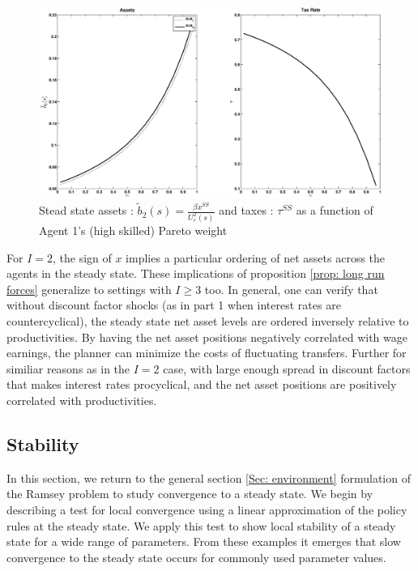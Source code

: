 \documentclass[thmsb,11pt]{article}
\begin{document}
  \begin{figure}[htp]
 \centering
 \includegraphics[width=\textwidth]{Draft25Graphs/SS_alpha1.eps}
 \caption{ Stead state assets : $\tilde{b}_2(s)=\frac{\beta  x^{SS}}{U^2_c(s)}$ and taxes : $\tau^{SS}$ as a function of Agent 1's (high skilled) Pareto weight}
 \label{fig: SS comparative}
 \end{figure}

 For $I=2$, the sign of $x$ implies a particular ordering of net assets across the agents in the steady state. These implications of proposition \ref{prop: long run forces} generalize to settings with $I\geq3$ too. In general, one can verify that without discount factor shocks (as in  part 1 when interest rates are countercyclical), the steady state net asset levels are ordered inversely relative to productivities. By having the net asset positions negatively correlated with wage earnings, the planner can minimize the costs of fluctuating transfers. Further for similiar reasons as in the $I=2$ case,  with large enough spread in discount factors that makes interest rates procyclical, and the net asset positions are positively correlated with productivities.
 
 

\subsection{Stability}
In this section, we return to the general section \ref{Sec: environment} formulation of the Ramsey problem  to study convergence to a steady state. We begin by describing a test for local convergence using a linear approximation of the policy rules at the steady state. We apply this test to show local stability of a steady state for a wide range of parameters. From these examples it emerges that slow convergence to the steady state occurs for  commonly used parameter values.
\end{document}
